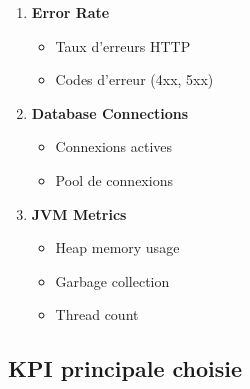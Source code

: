 \documentclass[12pt,a4paper]{article}
\begin{document}
\begin{enumerate}
    \item \textbf{Error Rate}
    \begin{itemize}
        \item Taux d'erreurs HTTP
        \item Codes d'erreur (4xx, 5xx)
    \end{itemize}
    
    \item \textbf{Database Connections}
    \begin{itemize}
        \item Connexions actives
        \item Pool de connexions
    \end{itemize}
    
    \item \textbf{JVM Metrics}
    \begin{itemize}
        \item Heap memory usage
        \item Garbage collection
        \item Thread count
    \end{itemize}
\end{enumerate}

\subsection{KPI principale choisie}
\end{document}
